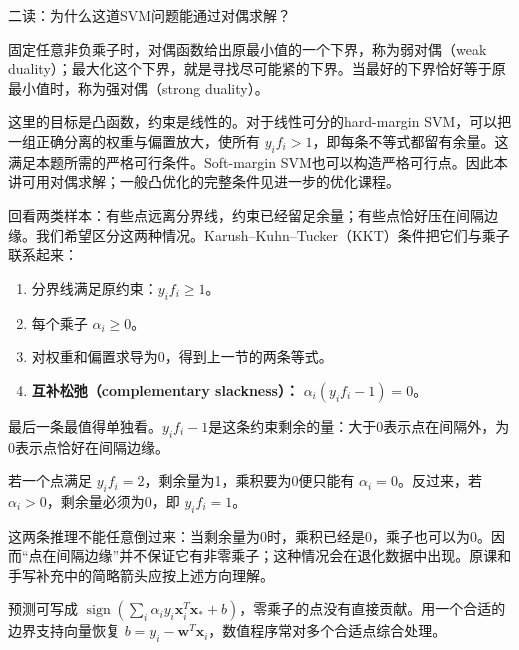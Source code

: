 \begin{StudySolution}{二读：为什么这道SVM问题能通过对偶求解？}


固定任意非负乘子时，对偶函数给出原最小值的一个下界，称为弱对偶（weak duality）；最大化这个下界，就是寻找尽可能紧的下界。当最好的下界恰好等于原最小值时，称为强对偶（strong duality）。


这里的目标是凸函数，约束是线性的。对于线性可分的hard-margin SVM，可以把一组正确分离的权重与偏置放大，使所有 \(y_if_i>1\)，即每条不等式都留有余量。这满足本题所需的严格可行条件。Soft-margin SVM也可以构造严格可行点。因此本讲可用对偶求解；一般凸优化的完整条件见进一步的优化课程。


\end{StudySolution}





回看两类样本：有些点远离分界线，约束已经留足余量；有些点恰好压在间隔边缘。我们希望区分这两种情况。Karush–Kuhn–Tucker（KKT）条件把它们与乘子联系起来：



\begin{enumerate}[start=1]

\item 分界线满足原约束：\(y_if_i\ge1\)。

\item 每个乘子 \(\alpha_i\ge0\)。

\item 对权重和偏置求导为0，得到上一节的两条等式。

\item \textbf{互补松弛（complementary slackness）：} \(\alpha_i(y_if_i-1)=0\)。

\end{enumerate}


最后一条最值得单独看。\(y_if_i-1\)是这条约束剩余的量：大于0表示点在间隔外，为0表示点恰好在间隔边缘。


若一个点满足 \(y_if_i=2\)，剩余量为1，乘积要为0便只能有 \(\alpha_i=0\)。反过来，若 \(\alpha_i>0\)，剩余量必须为0，即 \(y_if_i=1\)。


这两条推理不能任意倒过来：当剩余量为0时，乘积已经是0，乘子也可以为0。因而“点在间隔边缘”并不保证它有非零乘子；这种情况会在退化数据中出现。原课和手写补充中的简略箭头应按上述方向理解。


预测可写成 \(\operatorname{sign}(\sum_i\alpha_i y_i\mathbf x_i^T\mathbf x_*+b)\)，零乘子的点没有直接贡献。用一个合适的边界支持向量恢复 \(b=y_i-\mathbf w^T\mathbf x_i\)，数值程序常对多个合适点综合处理。


